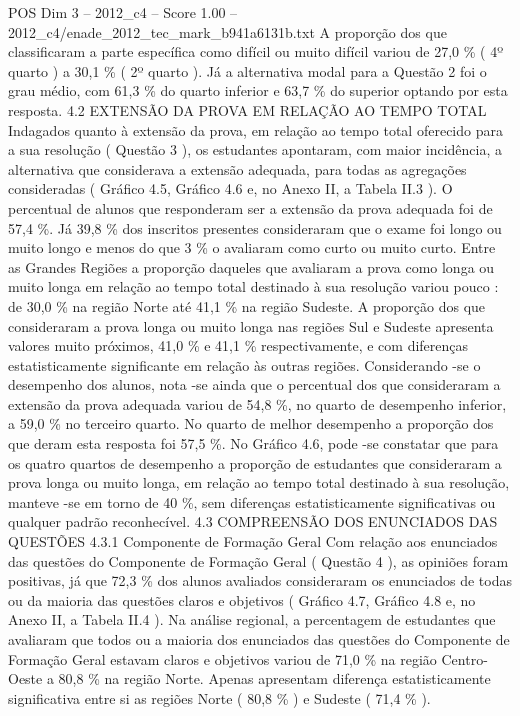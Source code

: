 \begin{textsample}{POS Dim 3 – 2012\_c4 – Score 1.00 – 2012\_c4/enade\_2012\_tec\_mark\_b941a6131b.txt}
A proporção dos que classificaram a parte específica como difícil ou muito difícil variou de 27,0 \% ( 4º quarto ) a 30,1 \% ( 2º quarto ).
Já a alternativa modal para a Questão 2 foi o grau médio, com 61,3 \% do quarto inferior e 63,7 \% do superior optando por esta resposta. 4.2 EXTENSÃO DA PROVA EM RELAÇÃO AO TEMPO TOTAL Indagados quanto à extensão da prova, em relação ao tempo total oferecido para a sua resolução ( Questão 3 ), os estudantes apontaram, com maior incidência, a alternativa que considerava a extensão adequada, para todas as agregações consideradas ( Gráfico 4.5, Gráfico 4.6 e, no Anexo II, a Tabela II.3 ).
O percentual de alunos que responderam ser a extensão da prova adequada foi de 57,4 \%.
Já 39,8 \% dos inscritos presentes consideraram que o exame foi longo ou muito longo e menos do que 3 \% o avaliaram como curto ou muito curto.
Entre as Grandes Regiões a proporção daqueles que avaliaram a prova como longa ou muito longa em relação ao tempo total destinado à sua resolução variou pouco : de 30,0 \% na região Norte até 41,1 \% na região Sudeste.
A proporção dos que consideraram a prova longa ou muito longa nas regiões Sul e Sudeste apresenta valores muito próximos, 41,0 \% e 41,1 \% respectivamente, e com diferenças estatisticamente significante em relação às outras regiões.
Considerando -se o desempenho dos alunos, nota -se ainda que o percentual dos que consideraram a extensão da prova adequada variou de 54,8 \%, no quarto de desempenho inferior, a 59,0 \% no terceiro quarto.
No quarto de melhor desempenho a proporção dos que deram esta resposta foi 57,5 \%.
No Gráfico 4.6, pode -se constatar que para os quatro quartos de desempenho a proporção de estudantes que consideraram a prova longa ou muito longa, em relação ao tempo total destinado à sua resolução, manteve -se em torno de 40 \%, sem diferenças estatisticamente significativas ou qualquer padrão reconhecível. 4.3 COMPREENSÃO DOS ENUNCIADOS DAS QUESTÕES 4.3.1 Componente de Formação Geral Com relação aos enunciados das questões do Componente de Formação Geral ( Questão 4 ), as opiniões foram positivas, já que 72,3 \% dos alunos avaliados consideraram os enunciados de todas ou da maioria das questões claros e objetivos ( Gráfico 4.7, Gráfico 4.8 e, no Anexo II, a Tabela II.4 ).
Na análise regional, a percentagem de estudantes que avaliaram que todos ou a maioria dos enunciados das questões do Componente de Formação Geral estavam claros e objetivos variou de 71,0 \% na região Centro-Oeste a 80,8 \% na região Norte.
Apenas apresentam diferença estatisticamente significativa entre si as regiões Norte ( 80,8 \% ) e Sudeste ( 71,4 \% ).

\end{textsample}
